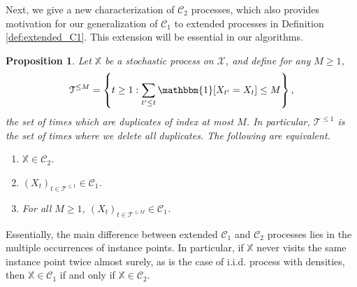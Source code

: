 \documentclass[aos]{imsart}
\theoremstyle{plain}
\newtheorem{proposition}[theorem]{Proposition}
\theoremstyle{remark}
\newcommand{\Ccal}{\mathcal{C}}
\newcommand{\Tcal}{\mathcal{T}}
\newcommand{\Xcal}{\mathcal{X}}
\newcommand{\Xbb}{\mathbb{X}}
\newcommand{\1}{\mathbbm{1}}%
\begin{document}
Next, we give a new characterization of $\Ccal_2$ processes, which also provides motivation for our generalization of $\Ccal_1$ to extended processes in Definition \ref{def:extended_C1}. This extension will be essential in our algorithms.

\begin{proposition}\label{prop:C2_equivalent_forms}
Let $\Xbb$ be a stochastic process on $\Xcal$, and define for any $M\geq 1$,
\begin{equation*}
    \Tcal^{\leq M} = \left\{t\geq 1: \sum_{t'\leq t}\1[X_{t'}=X_t]\leq M \right\},
\end{equation*}
the set of times which are duplicates of index at most $M$. In particular, $\Tcal^{\leq 1}$ is the set of times where we delete all duplicates. The following are equivalent.
\begin{enumerate}
    \item $\Xbb\in\Ccal_2$.
    \item $(X_t)_{t\in\Tcal^{\leq 1}} \in\Ccal_1$.
    \item For all $M\geq 1$, $(X_t)_{t\in\Tcal^{\leq M}} \in\Ccal_1$.
\end{enumerate}
\end{proposition}

Essentially, the main difference between extended $\Ccal_1$ and $\Ccal_2$ processes lies in the multiple occurrences of instance points. In particular, if $\Xbb$ never visits the same instance point twice almost surely, as is the case of i.i.d. process with densities, then $\Xbb\in\Ccal_1$ if and only if $\Xbb\in\Ccal_2$.
\end{document}
